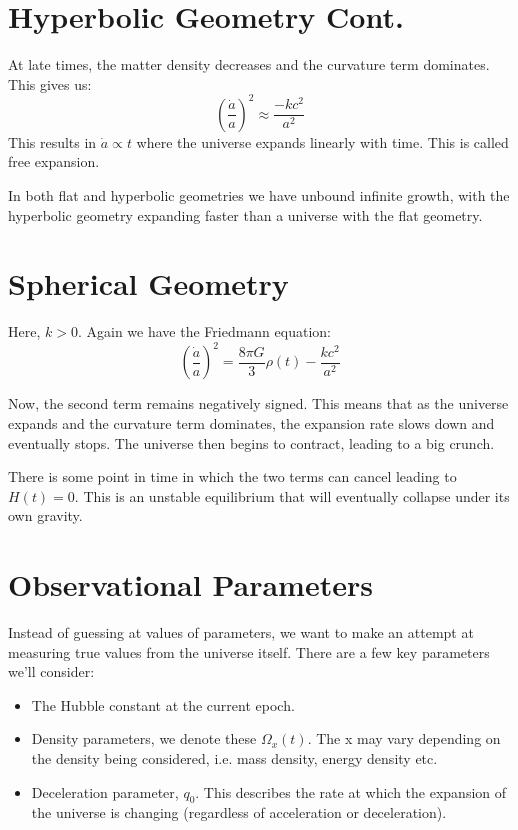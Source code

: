 
\section{Hyperbolic Geometry Cont.}
At late times, the matter density decreases and the curvature term dominates. This gives us:
\[
    \left(\frac{\dot{a}}{a}\right)^2 \approx \frac{-kc^2}{a^2}
\]
This results in $\dot{a} \propto t$ where the universe expands linearly with time. This is called free expansion.

In both flat and hyperbolic geometries we have unbound infinite growth, with the hyperbolic geometry expanding faster than a universe with the flat geometry.

\section{Spherical Geometry}
Here, $k > 0$. Again we have the Friedmann equation:
\[
    \left(\frac{\dot{a}}{a}\right)^2 = \frac{8 \pi G}{3} \rho(t) - \frac{kc^2}{a^2}
\]

Now, the second term remains negatively signed. This means that as the universe expands and the curvature term dominates, the expansion rate slows down and eventually stops. The universe then begins to contract, leading to a big crunch.

There is some point in time in which the two terms can cancel leading to $H(t) = 0$. This is an unstable equilibrium that will eventually collapse under its own gravity.

\section{Observational Parameters}
Instead of guessing at values of parameters, we want to make an attempt at measuring true values from the universe itself. There are a few key parameters we'll consider:
\begin{itemize}
    \item The Hubble constant at the current epoch.
    \item Density parameters, we denote these $\Omega_x(t)$. The x may vary depending on the density being considered, i.e. mass density, energy density etc.
    \item Deceleration parameter, $q_0$. This describes the rate at which the expansion of the universe is changing (regardless of acceleration or deceleration).
\end{itemize}

